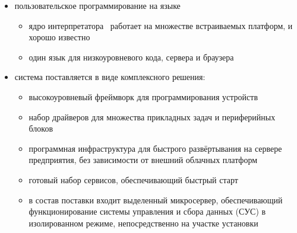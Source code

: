 \clearpage
{}
\begin{itemize}[nosep]
    \item пользовательское программирование на языке \js
    \begin{itemize}[nosep]
        \item ядро интерпретатора \esp\ работает на множестве встраиваемых
        платформ, и хорошо известно
        \item один язык для низкоуровневого кода, сервера и браузера
    \end{itemize}
    \item система поставляется в виде комплексного решения:
    \begin{itemize}[nosep]
        \item высокоуровневый фреймворк для программирования устройств
        \item набор драйверов для множества прикладных задач и периферийных
        блоков
        \item программная инфраструктура для быстрого развёртывания на сервере
        предприятия, без зависимости от внешний облачных платформ
        \item готовый набор сервисов, обеспечивающий быстрый старт
        \item в состав поставки входит выделенный микросервер, обеспечивающий
        функционирование системы управления и сбора данных (СУС) в изолированном
        режиме, непосредственно на участке установки
    \end{itemize}
\end{itemize}
